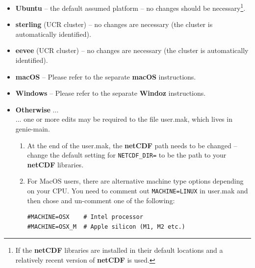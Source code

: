 \begin{itemize}

\vspace{1mm}
\item \textbf{Ubuntu} -- the default assumed platform -- no changes should be necessary\footnote{If the \textbf{netCDF} libraries are installed in their default locations and a relatively recent version of \textbf{netCDF} is used.}.

\vspace{1mm}
\item \textbf{sterling} (UCR cluster) -- no changes are necessary (the cluster is automatically identified).

\vspace{1mm}
\item \textbf{eevee} (UCR cluster) -- no changes are necessary (the cluster is automatically identified).

\vspace{1mm}
\item \textbf{macOS} -- Please refer to the separate \textbf{macOS} instructions.

\vspace{1mm}
\item \textbf{Windows} -- Please refer to the separate \textbf{Windoz} instructions.

\vspace{1mm} 
\item \textbf{Otherwise} ...
\\... one or more edits may  be required to the file \textsf{\footnotesize user.mak}, which lives in \textsf{\footnotesize genie-main}.

\begin{enumerate}[noitemsep]
\vspace{2mm}
\item At the end of the \textsf{\footnotesize user.mak}, the \textbf{netCDF} path needs to be changed -- change the default setting for \texttt{\small NETCDF\_DIR=} to be the path to your \textbf{netCDF} libraries.

\vspace{2mm}
\item For MacOS users, there are alternative machine type options depending on your CPU. You need to comment out \texttt{MACHINE=LINUX} in  \textsf{\footnotesize user.mak} and then chose and un-comment one of the following:
\small\begin{verbatim}
#MACHINE=OSX	# Intel processor
#MACHINE=OSX_M	# Apple silicon (M1, M2 etc.)
\end{verbatim}\normalsize

\end{enumerate}

\end{itemize}

